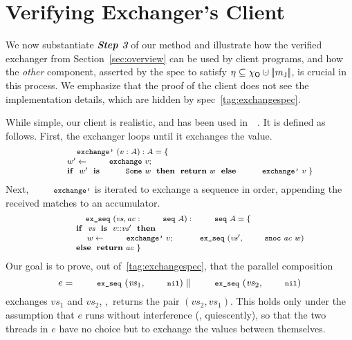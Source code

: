 \section{Verifying Exchanger's Client}
\label{sec:cal}
\newcommand{\ts}{\mathit{ts}}
\newcommand{\vvs}{\mathit{vs}}
\newcommand{\acc}{\mathit{ac}}
\newcommand{\ws}{\mathit{ws}}
\newcommand{\sorted}[1]{\mathsf{sorted}\ #1}


We now substantiate \textbf{\emph{Step 3}} of our method and
illustrate how the verified exchanger from Section~\ref{sec:overview}
can be used by client programs, and how the \emph{other} component,
asserted by the spec to satisfy
$\gist \subseteq \histo \hunion \mygather{\pending}$, is crucial in
this process.
%
We emphasize that the proof of the client does not see the
implementation details, which are hidden by
spec~\eqref{tag:exchangespec}.
%

While simple, our client is realistic, and has been used
in~~\cite{ExchangerClass}. It is defined as
follows. First, the exchanger loops until it exchanges the value.
%
\vspace{-2pt}
\[
\vspace{-2pt}
{\small{
\begin{array}{rl}
& \esc{exchange'}~(v : A) : A = \{\\[1pt]
&  ~~~~ w' \Asgn \esc{exchange}~v;\\[1pt]
&  ~~~~
  \kw{if}~~w'~~\kw{is}~~\esc{Some}~w~~\kw{then}~~\kw{return}~w~~\kw{else}~~\esc{exchange'}~v~\}
\end{array}
}}
\]
%
Next, $\esc{exchange'}$ is iterated to exchange a sequence in order,
appending the received matches to an accumulator.
%
\[
{\small{
\begin{array}{rl}
& \esc{ex\_seq}~(\vvs, \acc : \esc{seq}~A) : \esc{seq}~A = \{\\[1pt]
& ~~~~ \kw{if}~~\vvs~~\kw{is}~~v{::}\vvs'~~\kw{then}\\[1pt]
& ~~~~ ~~~~ w \Asgn \esc{exchange'}~v;~~\esc{ex\_seq}~(\vvs', \esc{snoc}~\acc~w)\\[1pt]
& ~~~~ \kw{else}~~\kw{return}~\acc~\}
\end{array}
}}
\]
%
Our goal is to prove, out of~\eqref{tag:exchangespec},
that the parallel composition
%
\[
e = \esc{ex\_seq}~(\vvs_1, \esc{nil}) \parallel \esc{ex\_seq}~(\vvs_2, \esc{nil})
\]
%
exchanges $\vvs_1$ and $\vvs_2$, \ie,~returns the pair $(\vvs_2,
\vvs_1)$. This holds only under the assumption that $e$ runs without
interference (\ie, quiescently), so that the two threads in $e$ have
no choice but to exchange the values between themselves. 

